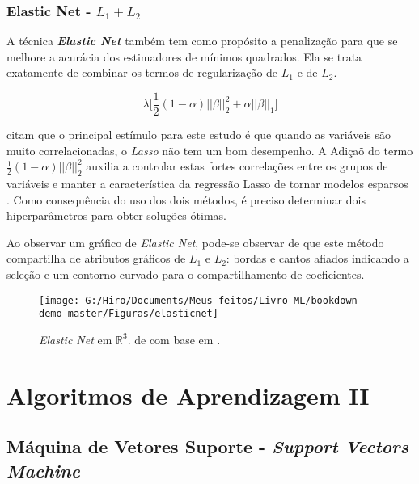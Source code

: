 \documentclass[
]{book}
\begin{document}
\hypertarget{elasticnet}{%
\subsection{\texorpdfstring{Elastic Net - \(L_1+L_2\)}{Elastic Net - L\_1+L\_2}}\label{elasticnet}}

A técnica \textbf{\emph{Elastic Net}} \citep{zou2005regularization} também tem como propósito a penalização para que se melhore a acurácia dos estimadores de mínimos quadrados. Ela se trata exatamente de combinar os termos de regularização de \(L_1\) e de \(L_2\).

\begin{equation}
    \lambda\bigg[ \frac{1}{2}(1-\alpha)||\beta||_2^2+\alpha||\beta||_1\bigg]
  \label{eq:elsticnet}
\end{equation}

\citet{hastie2015statistical} citam que o principal estímulo para este estudo é que quando as variáveis são muito correlacionadas, o \emph{Lasso} não tem um bom desempenho. A Adiçaõ do termo \(\frac{1}{2}(1-\alpha)||\beta||^2_2\) auxilia a controlar estas fortes correlações entre os grupos de variáveis e manter a característica da regressão Lasso de tornar modelos esparsos \citep{silva2018tecnica}. Como consequência do uso dos dois métodos, é preciso determinar dois hiperparâmetros para obter soluções ótimas.

Ao observar um gráfico de \emph{Elastic Net}, pode-se observar de que este método compartilha de atributos gráficos de \(L_1\) e \(L_2\): bordas e cantos afiados indicando a seleção e um contorno curvado para o compartilhamento de coeficientes.

\begin{figure}

{\centering \texttt{[image: G:/Hiro/Documents/Meus feitos/Livro ML/bookdown-demo-master/Figuras/elasticnet]} 

}

\caption{\emph{Elastic Net} em \(\mathbb{R}^3\). de \citet{silva2018tecnica} com base em \citet{hastie2015statistical}.}\label{fig:elasticnet}
\end{figure}



\hypertarget{ptII}{%
\chapter{Algoritmos de Aprendizagem II}\label{ptII}}

\hypertarget{svm}{%
\section{\texorpdfstring{Máquina de Vetores Suporte - \emph{Support Vectors Machine}}{Máquina de Vetores Suporte - Support Vectors Machine}}\label{svm}}
\end{document}
